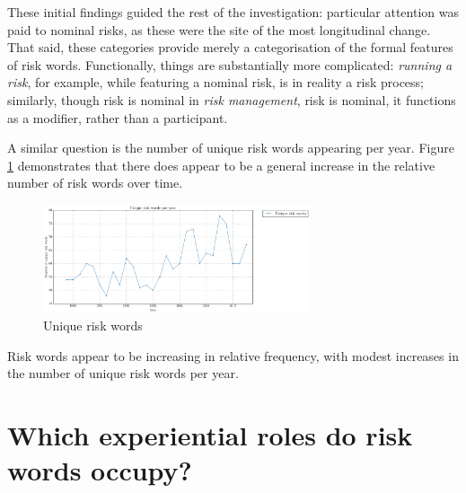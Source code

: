     These initial findings guided the rest of the investigation: particular attention was paid to nominal risks, as these were the site of the most longitudinal change. That said, these categories provide merely a categorisation of the formal features of risk words. Functionally, things are substantially more complicated: \emph{running a risk}, for example, while featuring a nominal risk, is in reality a risk process; similarly, though risk is nominal in \emph{risk management}, risk is nominal, it functions as a modifier, rather than a participant.

    A similar question is the number of unique risk words appearing per year. Figure \ref{fig:diffriskwords} demonstrates that there does appear to be a general increase in the relative number of risk words over time.

    \begin{figure}[htb!]
    \centering
    \includegraphics[width=0.7\textwidth]{../images/unique_risk_words_per_year.png}
    \caption{Unique risk words}
    \label{fig:diffriskwords}
    \end{figure}

    \vspace{5mm}\noindent\begin{tcolorbox}[colback=yellow!5,colframe=yellow!40!black,title=Summary: frequency of risk words]
    \parbox{1\textwidth}{%
    Risk words appear to be increasing in relative frequency, with modest increases in the number of unique risk words per year.}
    \end{tcolorbox}
    \vspace{5mm}



\section{Which experiential roles do risk words occupy?} \FloatBarrier

